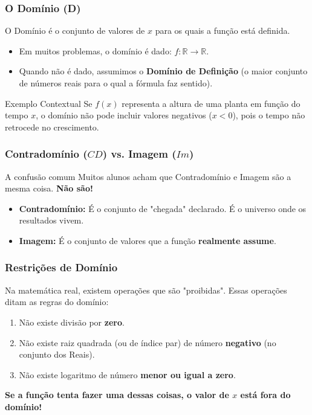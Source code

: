 \documentclass[9pt]{beamer}
\begin{document}
\begin{frame}
\frametitle{O Domínio (D)}
O Domínio é o conjunto de valores de $x$ para os quais a função está definida.

\begin{itemize}
    \item Em muitos problemas, o domínio é dado: $f: \mathbb{R} \to \mathbb{R}$.
    \item Quando não é dado, assumimos o \textbf{Domínio de Definição} (o maior conjunto de números reais para o qual a fórmula faz sentido).
\end{itemize}

\begin{exampleblock}{Exemplo Contextual}
Se $f(x)$ representa a altura de uma planta em função do tempo $x$, o domínio não pode incluir valores negativos ($x < 0$), pois o tempo não retrocede no crescimento.
\end{exampleblock}
\end{frame}

\begin{frame}
\frametitle{Contradomínio ($CD$) vs. Imagem ($Im$)}
\begin{alertblock}{A confusão comum}
Muitos alunos acham que Contradomínio e Imagem são a mesma coisa. \textbf{Não são!}
\end{alertblock}

\begin{itemize}
    \item \textbf{Contradomínio:} É o conjunto de "chegada" declarado. É o universo onde os resultados vivem.
    \item \textbf{Imagem:} É o conjunto de valores que a função \textbf{realmente assume}.
\end{itemize}

\centering
{}
\end{frame}

\begin{frame}
\frametitle{Restrições de Domínio}
Na matemática real, existem operações que são "proibidas". Essas operações ditam as regras do domínio:

\begin{enumerate}
    \item Não existe divisão por \textbf{zero}.
    \item Não existe raiz quadrada (ou de índice par) de número \textbf{negativo} (no conjunto dos Reais).
    \item Não existe logaritmo de número \textbf{menor ou igual a zero}.
\end{enumerate}

\begin{center}
\textbf{Se a função tenta fazer uma dessas coisas, o valor de $x$ está fora do domínio!}
\end{center}
\end{frame}
\end{document}
